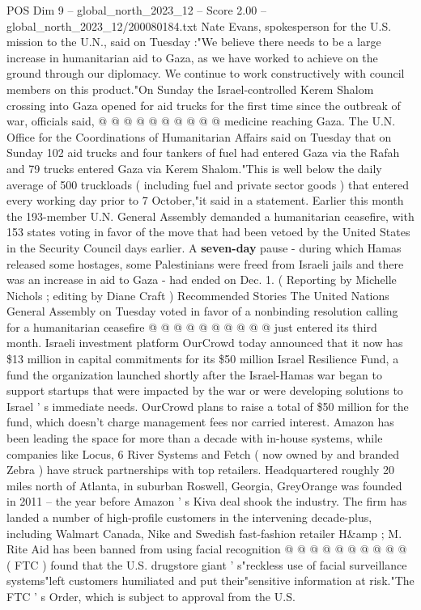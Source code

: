 \begin{textsample}{POS Dim 9 – global\_north\_2023\_12 – Score 2.00 – global\_north\_2023\_12/200080184.txt}
Nate Evans, spokesperson for the U.S. mission to the U.N., said on Tuesday :"We believe there needs to be a large increase in humanitarian aid to Gaza, as we have worked to achieve on the ground through our diplomacy.
We continue to work constructively with council members on this product."On Sunday the Israel-controlled Kerem Shalom crossing into Gaza opened for aid trucks for the first time since the outbreak of war, officials said, @ @ @ @ @ @ @ @ @ @ medicine reaching Gaza.
The U.N.
Office for the Coordinations of Humanitarian Affairs said on Tuesday that on Sunday 102 aid trucks and four tankers of fuel had entered Gaza via the Rafah and 79 trucks entered Gaza via Kerem Shalom."This is well below the daily average of 500 truckloads ( including fuel and private sector goods ) that entered every working day prior to 7 October,"it said in a statement.
Earlier this month the 193-member U.N.
General Assembly demanded a humanitarian ceasefire, with 153 states voting in favor of the move that had been vetoed by the United States in the Security Council days earlier.
A \textbf{seven-day} pause - during which Hamas released some hostages, some Palestinians were freed from Israeli jails and there was an increase in aid to Gaza - had ended on Dec. 1. ( Reporting by Michelle Nichols ; editing by Diane Craft ) Recommended Stories The United Nations General Assembly on Tuesday voted in favor of a nonbinding resolution calling for a humanitarian ceasefire @ @ @ @ @ @ @ @ @ @ just entered its third month.
Israeli investment platform OurCrowd today announced that it now has \$13 million in capital commitments for its \$50 million Israel Resilience Fund, a fund the organization launched shortly after the Israel-Hamas war began to support startups that were impacted by the war or were developing solutions to Israel ' s immediate needs.
OurCrowd plans to raise a total of \$50 million for the fund, which doesn't charge management fees nor carried interest.
Amazon has been leading the space for more than a decade with in-house systems, while companies like Locus, 6 River Systems and Fetch ( now owned by and branded Zebra ) have struck partnerships with top retailers.
Headquartered roughly 20 miles north of Atlanta, in suburban Roswell, Georgia, GreyOrange was founded in 2011 -- the year before Amazon ' s Kiva deal shook the industry.
The firm has landed a number of high-profile customers in the intervening decade-plus, including Walmart Canada, Nike and Swedish fast-fashion retailer H\&amp ; M.
Rite Aid has been banned from using facial recognition @ @ @ @ @ @ @ @ @ @ ( FTC ) found that the U.S. drugstore giant ' s"reckless use of facial surveillance systems"left customers humiliated and put their"sensitive information at risk."The FTC ' s Order, which is subject to approval from the U.S.

\end{textsample}
